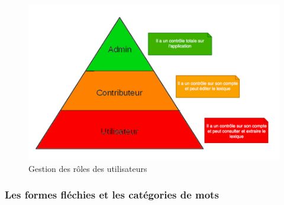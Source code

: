 \documentclass[a4paper, 12pt]{article}
\begin{document}
\begin{figure}[H] 
    \centering
    \includegraphics[scale=0.5]{role.png}
    \caption{Gestion des rôles des utilisateurs }
\end{figure}
\newpage

\subsubsection{Les formes fléchies et les catégories de mots}
\end{document}
